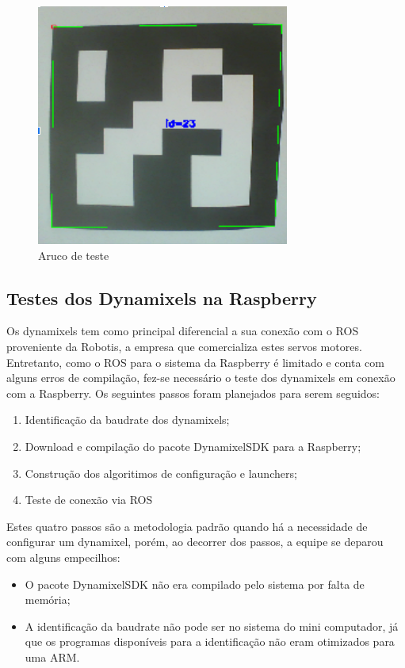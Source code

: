 \begin{figure}[H]
	\centering
	\includegraphics[scale=0.8, angle=0]{Figures/aruco1.png}
	\caption{Aruco de teste}
	\label{fig:aruco1}
\end{figure}

\subsection{Testes dos Dynamixels na Raspberry}
Os dynamixels tem como principal diferencial a sua conexão com o ROS proveniente da Robotis, a empresa que comercializa estes servos motores. Entretanto, como o ROS para o sistema da Raspberry é limitado e conta com alguns erros de compilação, fez-se necessário o teste dos dynamixels em conexão com a Raspberry. Os seguintes passos foram planejados para serem seguidos:

\begin{enumerate}
	\item Identificação da baudrate dos dynamixels;
	\item Download e compilação do pacote DynamixelSDK para a Raspberry;
	\item Construção dos algoritimos de configuração e launchers;
	\item Teste de conexão via ROS
\end{enumerate}

Estes quatro passos são a metodologia padrão quando há a necessidade de configurar um dynamixel, porém, ao decorrer dos passos, a equipe se deparou com alguns empecilhos:
\begin{itemize}
	\item O pacote DynamixelSDK não era compilado pelo sistema por falta de memória;
	\item A identificação da baudrate não pode ser no sistema do mini computador, já que os programas disponíveis para a identificação não eram otimizados para uma ARM.
\end{itemize}

